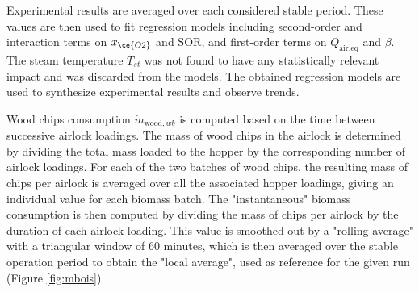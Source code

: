 Experimental results are averaged over each considered stable period. These values are then used to fit regression models including second-order and interaction terms on $x_{\ce{O2}}$ and $\mathrm{SOR}$, and first-order terms on $Q_{\text{air,eq}}$ and $\beta$. The steam temperature $T_{st}$ was not found to have any statistically relevant impact and was discarded from the models. The obtained regression models are used to synthesize experimental results and observe trends.

Wood chips consumption $\dot m_{\text{wood},\mathit{wb}}$ is computed based on the time between successive airlock loadings. The mass of wood chips in the airlock is determined by dividing the total mass loaded to the hopper by the corresponding number of airlock loadings. For each of the two batches of wood chips, the resulting mass of chips per airlock is averaged over all the associated hopper loadings, giving an individual value for each biomass batch. The "instantaneous" biomass consumption is then computed by dividing the mass of chips per airlock by the duration of each airlock loading. This value is smoothed out by a "rolling average" with a triangular window of 60 minutes, which is then averaged over the stable operation period to obtain the "local average", used as reference for the given run (Figure \ref{fig:mbois}).



